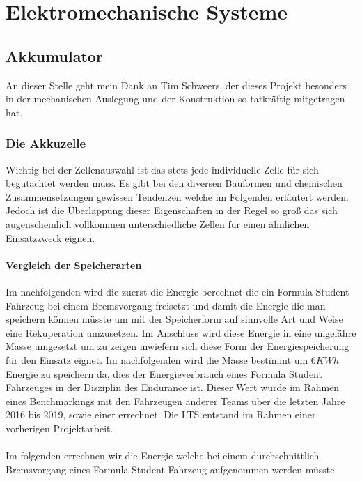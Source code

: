
\chapter{Elektromechanische Systeme}

\section{Akkumulator}
An dieser Stelle geht mein Dank an Tim Schweers, der dieses Projekt besonders in der mechanischen Auslegung und der Konstruktion so tatkräftig mitgetragen hat.

\subsection{Die Akkuzelle}

Wichtig bei der Zellenauswahl ist das stets jede individuelle Zelle für sich begutachtet werden muss. Es gibt bei den diversen Bauformen und chemischen Zusammensetzungen gewissen Tendenzen welche im Folgenden erläutert werden. Jedoch ist die Überlappung dieser Eigenschaften in der Regel so groß das sich augenscheinlich vollkommen unterschiedliche Zellen für einen ähnlichen Einsatzzweck eignen.
\FloatBarrier
\subsubsection{Vergleich der Speicherarten}

Im nachfolgenden wird die zuerst die Energie berechnet die ein Formula Student Fahrzeug bei einem Bremsvorgang freisetzt und damit die Energie die man speichern können müsste um mit der Speicherform auf sinnvolle Art und Weise eine Rekuperation umzusetzen. Im Anschluss wird diese Energie in eine ungefähre Masse umgesetzt um zu zeigen inwiefern sich diese Form der Energiespeicherung für den Einsatz eignet. Im nachfolgenden wird die Masse bestimmt um \ensuremath{6 KWh} Energie zu speichern da, dies der Energieverbrauch eines Formula Student Fahrzeuges in der Disziplin des Endurance ist. Dieser Wert wurde im Rahmen eines Benchmarkings mit den Fahrzeugen anderer Teams über die letzten Jahre 2016 bis 2019, sowie einer  errechnet. Die \ac{LTS} entstand im Rahmen einer vorherigen Projektarbeit. \cite{DeeDor2022}
\\
\\
Im folgenden errechnen wir die Energie welche bei einem durchschnittlich Bremsvorgang eines Formula Student Fahrzeug aufgenommen werden müsste. 

